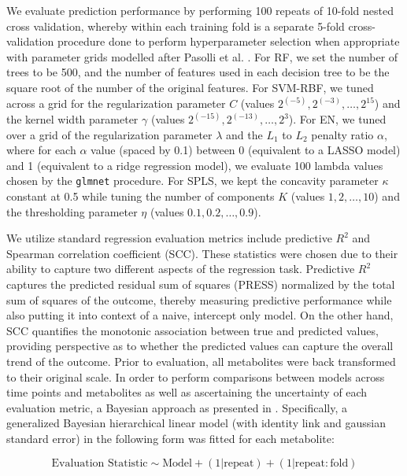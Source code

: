 We evaluate prediction performance by performing 100 repeats of 10-fold nested cross validation, whereby within each training fold is a separate 5-fold cross-validation procedure done to perform hyperparameter selection when appropriate with parameter grids modelled after Pasolli et al. \cite{pasolli2016machine}. For RF, we set the number of trees to be 500, and the number of features used in each decision tree to be the square root of the number of the original features. For SVM-RBF, we tuned across a grid for the regularization parameter $C$ (values $2^{(-5)},2^{(-3)},\ldots,2^{15}$) and the kernel width parameter $\gamma$ (values $2^{(-15)},2^{(-13)},\ldots,2^{3}$). For EN, we tuned over a grid of the regularization parameter $\lambda$ and the $L_1$ to $L_2$ penalty ratio $\alpha$, where for each $\alpha$ value (spaced by 0.1) between 0 (equivalent to a LASSO model) and 1 (equivalent to a ridge regression model), we evaluate 100 lambda values chosen by the \texttt{glmnet} procedure. For SPLS, we kept the concavity parameter $\kappa$ constant at 0.5 while tuning the number of components $K$ (values $1,2,\ldots,10$) and the thresholding parameter $\eta$ (values $0.1,0.2,\ldots,0.9$). 

We utilize standard regression evaluation metrics include predictive $R^2$ and Spearman correlation coefficient (SCC). These statistics were chosen due to their ability to capture two different aspects of the regression task. Predictive $R^2$ captures the predicted residual sum of squares (PRESS) normalized by the total sum of squares of the outcome, thereby measuring predictive performance while also putting it into context of a naive, intercept only model. On the other hand, SCC quantifies the monotonic association between true and predicted values, providing perspective as to  whether the predicted values can capture the overall trend of the outcome. Prior to evaluation, all metabolites were back transformed to their original scale. In order to perform comparisons between models across time points and metabolites as well as ascertaining the uncertainty of each evaluation metric, a Bayesian approach as presented in \cite{benavoli2017time}. Specifically, a generalized Bayesian hierarchical linear model (with identity link and gaussian standard error) in the following form was fitted for each metabolite:

$$
\text{Evaluation Statistic} \sim \text{Model} + (1 | \text{repeat})+(1 | \text{repeat}:\text{fold})
$$

